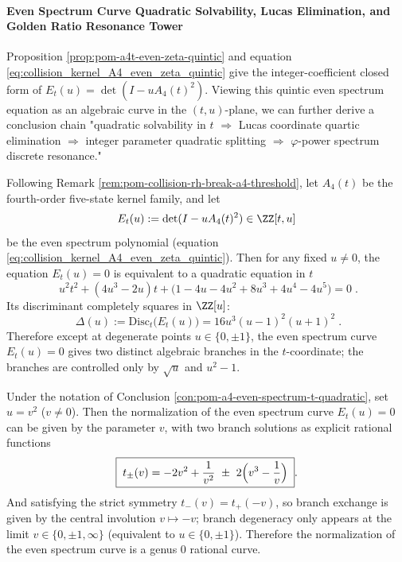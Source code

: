%
\paragraph{Even Spectrum Curve Quadratic Solvability, Lucas Elimination, and Golden Ratio Resonance Tower}
Proposition \ref{prop:pom-a4t-even-zeta-quintic} and equation \eqref{eq:collision_kernel_A4_even_zeta_quintic} give the integer-coefficient closed form of \(E_t(u)=\det(I-uA_4(t)^2)\).
Viewing this quintic even spectrum equation as an algebraic curve in the \((t,u)\)-plane, we can further derive a conclusion chain "quadratic solvability in \(t\) \(\Rightarrow\) Lucas coordinate quartic elimination \(\Rightarrow\) integer parameter quadratic splitting \(\Rightarrow\) \(\varphi\)-power spectrum discrete resonance."

\begin{conclusion}\label{con:pom-a4-even-spectrum-t-quadratic}
Following Remark \ref{rem:pom-collision-rh-break-a4-threshold}, let \(A_4(t)\) be the fourth-order five-state kernel family, and let
\[
E_t(u):=\det(I-uA_4(t)^2)\in\ZZ[t,u]
\]
be the even spectrum polynomial (equation \eqref{eq:collision_kernel_A4_even_zeta_quintic}).
Then for any fixed \(u\neq 0\), the equation \(E_t(u)=0\) is equivalent to a quadratic equation in \(t\)
\[
\boxed{\;
u^2 t^2+(4u^3-2u)t+\bigl(1-4u-4u^2+8u^3+4u^4-4u^5\bigr)=0\; } .
\]
Its discriminant completely squares in \(\ZZ[u]\):
\[
\boxed{\;
\Delta(u):=\mathrm{Disc}_t\!\bigl(E_t(u)\bigr)
=16u^3(u-1)^2(u+1)^2\; } .
\]
Therefore except at degenerate points \(u\in\{0,\pm1\}\), the even spectrum curve \(E_t(u)=0\) gives two distinct algebraic branches in the \(t\)-coordinate; the branches are controlled only by \(\sqrt u\) and \(u^2-1\).
\end{conclusion}

\begin{conclusion}[Global Rational Parameterization: \texorpdfstring{$u=v^2$}{u=v^2} Normalization and Branch Exchange Involution]\label{con:pom-a4-even-spectrum-rational-param}
Under the notation of Conclusion \ref{con:pom-a4-even-spectrum-t-quadratic}, set \(u=v^2\) (\(v\neq 0\)).
Then the normalization of the even spectrum curve \(E_t(u)=0\) can be given by the parameter \(v\), with two branch solutions as explicit rational functions
\[
\boxed{\;
t_{\pm}(v)= -2v^2+\frac{1}{v^2}\ \pm\ 2\Bigl(v^3-\frac{1}{v}\Bigr)\; } .
\]
And satisfying the strict symmetry \(t_{-}(v)=t_{+}(-v)\), so branch exchange is given by the central involution \(v\mapsto -v\); branch degeneracy only appears at the limit \(v\in\{0,\pm1,\infty\}\) (equivalent to \(u\in\{0,\pm1\}\)).
Therefore the normalization of the even spectrum curve is a genus \(0\) rational curve.
\end{conclusion}


